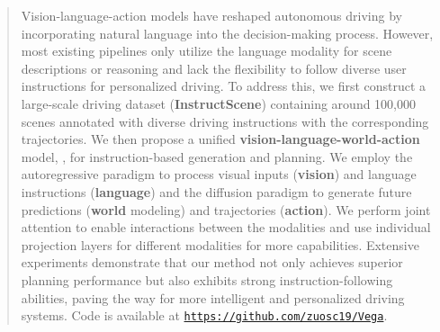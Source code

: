 \begin{abstract}
Vision-language-action models have reshaped autonomous driving by incorporating natural language into the decision-making process.
However, most existing pipelines only utilize the language modality for scene descriptions or reasoning and lack the flexibility to follow diverse user instructions for personalized driving. 
To address this, we first construct a large-scale driving dataset (\textbf{InstructScene}) containing around 100,000 scenes annotated with diverse driving instructions with the corresponding trajectories. 
We then propose a unified \textbf{vision-language-world-action} model, \model, for instruction-based generation and planning.
We employ the autoregressive paradigm to process visual inputs (\textbf{vision}) and language instructions (\textbf{language}) and the diffusion paradigm to generate future predictions (\textbf{world} modeling) and trajectories (\textbf{action}). 
We perform joint attention to enable interactions between the modalities and use individual projection layers for different modalities for more capabilities. 
Extensive experiments demonstrate that our method not only achieves superior planning performance but also exhibits strong instruction-following abilities, paving the way for more intelligent and personalized driving systems.
Code is available at \href{https://github.com/zuosc19/Vega}{{\texttt{https://github.com/zuosc19/Vega}}}.
\vspace{-1mm}
\end{abstract}

